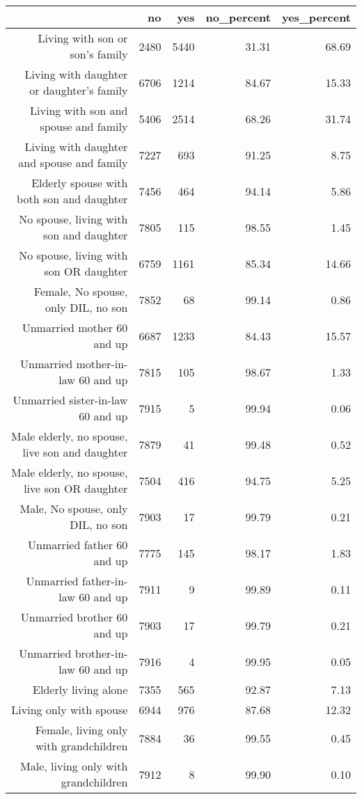 \documentclass[11pt]{article}
\begin{document}
\begin{table}[ht]
\centering
\begin{tabular}{rrrrr}
  \hline
 & no & yes & no\_percent & yes\_percent \\ 
  \hline
Living with son or son's family & 2480 & 5440 & 31.31 & 68.69 \\ 
  Living with daughter or daughter's family & 6706 & 1214 & 84.67 & 15.33 \\ 
  Living with son and spouse and family & 5406 & 2514 & 68.26 & 31.74 \\ 
  Living with daughter and spouse and family & 7227 & 693 & 91.25 & 8.75 \\ 
  Elderly spouse with both son and daughter & 7456 & 464 & 94.14 & 5.86 \\ 
  No spouse, living with son and daughter & 7805 & 115 & 98.55 & 1.45 \\ 
  No spouse, living with son OR daughter & 6759 & 1161 & 85.34 & 14.66 \\ 
  Female, No spouse, only DIL, no son & 7852 & 68 & 99.14 & 0.86 \\ 
  Unmarried mother 60 and up & 6687 & 1233 & 84.43 & 15.57 \\ 
  Unmarried mother-in-law 60 and up & 7815 & 105 & 98.67 & 1.33 \\ 
  Unmarried sister-in-law 60 and up & 7915 & 5 & 99.94 & 0.06 \\ 
  Male elderly, no spouse, live son and daughter & 7879 & 41 & 99.48 & 0.52 \\ 
  Male elderly, no spouse, live son OR daughter & 7504 & 416 & 94.75 & 5.25 \\ 
  Male, No spouse, only DIL, no son & 7903 & 17 & 99.79 & 0.21 \\ 
  Unmarried father 60 and up & 7775 & 145 & 98.17 & 1.83 \\ 
  Unmarried father-in-law 60 and up & 7911 & 9 & 99.89 & 0.11 \\ 
  Unmarried brother 60 and up & 7903 & 17 & 99.79 & 0.21 \\ 
  Unmarried brother-in-law 60 and up & 7916 & 4 & 99.95 & 0.05 \\ 
  Elderly living alone & 7355 & 565 & 92.87 & 7.13 \\ 
  Living only with spouse & 6944 & 976 & 87.68 & 12.32 \\ 
  Female, living only with grandchildren & 7884 & 36 & 99.55 & 0.45 \\ 
  Male, living only with grandchildren & 7912 & 8 & 99.90 & 0.10 \\ 
   \hline
\end{tabular}
\end{table}\newline
\end{document}
